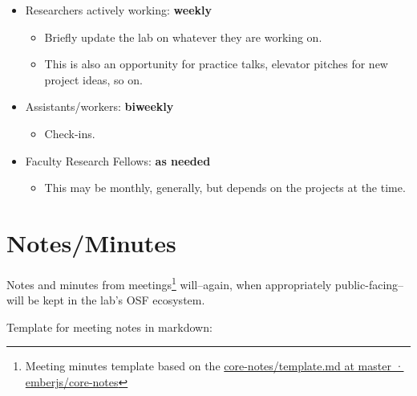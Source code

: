 \documentclass[
]{book}
\providecommand{\tightlist}{%
  \setlength{\itemsep}{0pt}\setlength{\parskip}{0pt}}
\begin{document}
\begin{itemize}
\tightlist
\item
  Researchers actively working: \textbf{weekly}

  \begin{itemize}
  \tightlist
  \item
    Briefly update the lab on whatever they are working on.
  \item
    This is also an opportunity for practice talks, elevator pitches for new project ideas, so on.
  \end{itemize}
\item
  Assistants/workers: \textbf{biweekly}

  \begin{itemize}
  \tightlist
  \item
    Check-ins.
  \end{itemize}
\item
  Faculty Research Fellows: \textbf{as needed}

  \begin{itemize}
  \tightlist
  \item
    This may be monthly, generally, but depends on the projects at the time.
  \end{itemize}
\end{itemize}

\hypertarget{notesminutes}{%
\section{Notes/Minutes}\label{notesminutes}}

Notes and minutes from meetings\footnote{Meeting minutes template based on the \href{https://github.com/emberjs/core-notes/blob/master/learning-team/template.md}{core-notes/template.md at master · emberjs/core-notes}} will--again, when appropriately public-facing--will be kept in the lab's OSF ecosystem.

Template for meeting notes in markdown:
\end{document}
